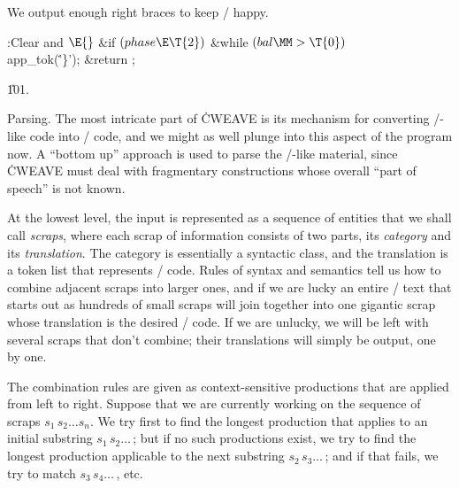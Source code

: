 We output
enough right braces to keep \TEX/ happy.

\Y\B\4:Clear  and \X${}\E{}$\6
\&{if} ${}(\\{phase}\E\T{2}){}$\1\6
\&{while} ${}(\\{bal}\MM>\T{0}){}$\1\5
\\{app\_tok}(\.{'\}'});\2\2\6
\&{return} ;\par
\U101.\fi

Parsing.
The most intricate part of \.{CWEAVE} is its mechanism for converting
\CEE/-like code into \TEX/ code, and we might as well plunge into this
aspect of the program now. A ``bottom up'' approach is used to parse the
\CEE/-like material, since \.{CWEAVE} must deal with fragmentary
constructions whose overall ``part of speech'' is not known.

At the lowest level, the input is represented as a sequence of entities
that we shall call {\it scraps}, where each scrap of information consists
of two parts, its {\it category} and its {\it translation}. The category
is essentially a syntactic class, and the translation is a token list that
represents \TEX/ code. Rules of syntax and semantics tell us how to
combine adjacent scraps into larger ones, and if we are lucky an entire
\CEE/ text that starts out as hundreds of small scraps will join
together into one gigantic scrap whose translation is the desired \TEX/
code. If we are unlucky, we will be left with several scraps that don't
combine; their translations will simply be output, one by one.

The combination rules are given as context-sensitive productions that are
applied from left to right. Suppose that we are currently working on the
sequence of scraps $s_1\,s_2\ldots s_n$. We try first to find the longest
production that applies to an initial substring $s_1\,s_2\ldots\,$; but if
no such productions exist, we try to find the longest production
applicable to the next substring $s_2\,s_3\ldots\,$; and if that fails, we
try to match $s_3\,s_4\ldots\,$, etc.

